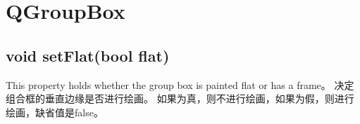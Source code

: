 \chapter{QGroupBox}
\section{void setFlat(bool flat)}
This property holds whether the group box is painted flat or has a frame。%
决定组合框的垂直边缘是否进行绘画。%
如果为真，则不进行绘画，如果为假，则进行绘画，缺省值是false。
